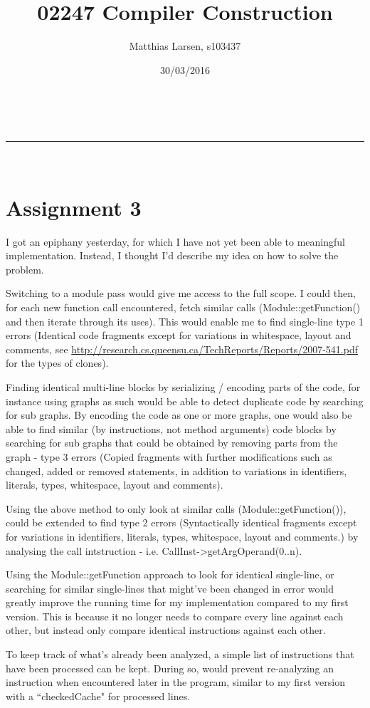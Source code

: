 \documentclass[a4paper,11pt]{article}
\makeatletter
\newcommand{\linia}{\rule{\linewidth}{0.5pt}}
\theoremstyle{mytheor}
\renewcommand{\maketitle}{
\begin{center}
\vspace{2ex}
{\huge \textsc{\@title}}
\vspace{1ex}
\\
\linia\\
\@author \hfill \@date
\vspace{4ex}
\end{center}
}
\makeatother
\begin{document}
\title{02247 Compiler Construction}

\author{Matthias Larsen, s103437}

\date{30/03/2016}

\maketitle

\section*{Assignment 3}

I got an epiphany yesterday, for which I have not yet been able to meaningful implementation.
Instead, I thought I'd describe my idea on how to solve the problem.

Switching to a module pass would give me access to the full scope.
I could then, for each new function call encountered, fetch similar calls (Module::getFunction() and then iterate through its uses).
This would enable me to find single-line type 1 errors (Identical code fragments except for variations in whitespace, layout and comments, see \url{http://research.cs.queensu.ca/TechReports/Reports/2007-541.pdf} for the types of clones).

Finding identical multi-line blocks by serializing / encoding parts of the code, for instance using graphs as such would be able to detect duplicate code by searching for sub graphs.
By encoding the code as one or more graphs, one would also be able to find similar (by instructions, not method arguments) code blocks by searching for sub graphs that could be obtained by removing parts from the graph - type 3 errors (Copied fragments with further modifications such as changed, added or removed statements, in addition to variations in identifiers, literals, types, whitespace, layout and comments).

Using the above method to only look at similar calls (Module::getFunction()), could be extended to find type 2 errors (Syntactically identical fragments except for variations in identifiers, literals, types, whitespace, layout and comments.) by analysing the call intstruction - i.e. CallInst->getArgOperand(0..n).

Using the Module::getFunction approach to look for identical single-line, or searching for similar single-lines that might've been changed in error would greatly improve the running time for my implementation compared to my first version. This is because it no longer needs to compare every line against each other, but instead only compare identical instructions against each other.

To keep track of what's already been analyzed, a simple list of instructions that have been processed can be kept.
During so, would prevent re-analyzing an instruction when encountered later in the program, similar to my first version with a ``checkedCache" for processed lines.
\end{document}
